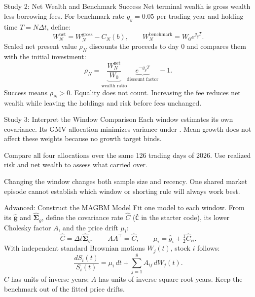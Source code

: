 \documentclass[aspectratio=169,11pt]{beamer}
\newcommand{\Sg}{\widehat{\boldsymbol{\Sigma}}_g}
\newcommand{\ghat}{\widehat{\mathbf{g}}}
\begin{document}
\begin{frame}{Study 2: Net Wealth and Benchmark Success}
Net terminal wealth is gross wealth less borrowing fees. For benchmark
rate $g_y=0.05$ per trading year and holding time $T=N\Delta t$, define:
\[
 W_N^{\mathrm{net}}=W_N^{\mathrm{gross}}-C_N(b),
 \qquad W_N^{\mathrm{benchmark}}=W_0 e^{g_yT}.
\]
Scaled net present value $\rho_N$ discounts the proceeds to day 0 and
compares them with the initial investment:
\[
 \rho_N=\underbrace{\frac{W_N^{\mathrm{net}}}{W_0}}_{\text{wealth ratio}}
       \underbrace{e^{-g_yT}}_{\text{discount factor}}-1.
\]
Success means $\rho_N>0$. Equality does not count. Increasing the fee
reduces net wealth while leaving the holdings and risk before fees unchanged.
\end{frame}

\begin{frame}{Study 3: Interpret the Window Comparison}
Each window estimates its own covariance. Its GMV allocation minimizes
variance under . Mean growth does not affect these
weights because no growth target binds.

\vspace{0.8em}
Compare all four allocations over the same 126 trading days of 2026.
Use realized risk and net wealth to assess what carried over.

\vspace{0.8em}
Changing the window changes both sample size and recency. One shared market
episode cannot establish which window or shorting rule will always work best.
\end{frame}

\begin{frame}{Advanced: Construct the MAGBM Model}
Fit one model to each window. From its $\ghat$ and $\Sg$, define the covariance
rate $\widehat C$ (\texttt{Ĉ} in the starter code), its lower Cholesky factor $A$,
and the price drift $\mu_i$:
\[
 \widehat C=\Delta t\Sg,\qquad AA^\top=\widehat C,\qquad
 \mu_i=\hat g_i+\tfrac12\widehat C_{ii}.
\]
With independent standard Brownian motions $W_j(t)$, stock $i$ follows:
\[
 \frac{dS_i(t)}{S_i(t)}=\mu_i\,dt+\sum_{j=1}^8 A_{ij}\,dW_j(t).
\]
$\widehat C$ has units of inverse years; $A$ has units of inverse square-root years.
Keep the benchmark out of the fitted price drifts.
\end{frame}
\end{document}
